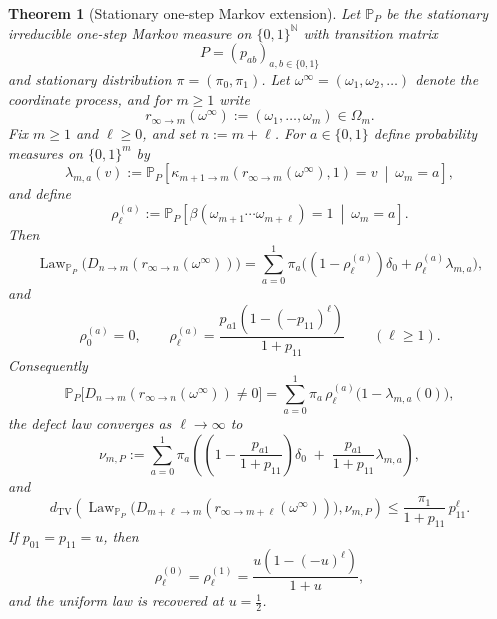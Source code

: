 \documentclass[11pt,reqno]{amsart}
\numberwithin{equation}{section}
\theoremstyle{plain}
\newtheorem{theorem}{Theorem}[section]
\theoremstyle{definition}
\theoremstyle{remark}
\newcommand{\NN}{\mathbb{N}}
\newcommand{\PP}{\mathbb{P}}
\DeclareMathOperator{\Law}{Law}
\begin{document}
\begin{theorem}[Stationary one-step Markov extension]
\label{thm:markov-defect-law}
Let $\PP_P$ be the stationary irreducible one-step Markov measure on
$\{0,1\}^{\NN}$ with transition matrix
\[
P=(p_{ab})_{a,b\in\{0,1\}}
\]
and stationary distribution $\pi=(\pi_0,\pi_1)$.  Let
$\omega^\infty=(\omega_1,\omega_2,\dots)$ denote the coordinate process, and
for $m\ge 1$ write
\[
r_{\infty\to m}(\omega^\infty):=(\omega_1,\dots,\omega_m)\in\Omega_m.
\]
Fix $m\ge 1$ and $\ell\ge 0$, and set $n:=m+\ell$.  For $a\in\{0,1\}$ define
probability measures on $\{0,1\}^m$ by
\[
\lambda_{m,a}(v)
:=
\PP_P\!\left[
\kappa_{m+1\to m}(r_{\infty\to m}(\omega^\infty),1)=v
\ \middle|\
\omega_m=a
\right],
\]
and define
\[
\rho_\ell^{(a)}
:=
\PP_P\!\left[
\beta(\omega_{m+1}\cdots\omega_{m+\ell})=1
\ \middle|\
\omega_m=a
\right].
\]
Then
\[
\Law_{\PP_P}\!\bigl(D_{n\to m}(r_{\infty\to n}(\omega^\infty))\bigr)
=
\sum_{a=0}^1
\pi_a\bigl((1-\rho_\ell^{(a)})\delta_0+\rho_\ell^{(a)}\lambda_{m,a}\bigr),
\]
and
\[
\rho_0^{(a)}=0,
\qquad
\rho_\ell^{(a)}
=
\frac{p_{a1}(1-(-p_{11})^\ell)}{1+p_{11}}
\qquad (\ell\ge 1).
\]
Consequently
\[
\PP_P\!\bigl[D_{n\to m}(r_{\infty\to n}(\omega^\infty))\ne 0\bigr]
=
\sum_{a=0}^1
\pi_a\,\rho_\ell^{(a)}\bigl(1-\lambda_{m,a}(0)\bigr),
\]
the defect law converges as $\ell\to\infty$ to
\[
\nu_{m,P}
:=
\sum_{a=0}^1
\pi_a\left(
\left(1-\frac{p_{a1}}{1+p_{11}}\right)\delta_0
\;+\;
\frac{p_{a1}}{1+p_{11}}\lambda_{m,a}
\right),
\]
and
\[
d_{\mathrm{TV}}
\!\left(
\Law_{\PP_P}\!\bigl(D_{m+\ell\to m}(r_{\infty\to m+\ell}(\omega^\infty))\bigr),
\nu_{m,P}
\right)
\le
\frac{\pi_1}{1+p_{11}}\,p_{11}^{\ell}.
\]
If $p_{01}=p_{11}=u$, then
\[
\rho_\ell^{(0)}=\rho_\ell^{(1)}
=
\frac{u(1-(-u)^\ell)}{1+u},
\]
and the uniform law is recovered at $u=\frac12$.
\end{theorem}
\end{document}
